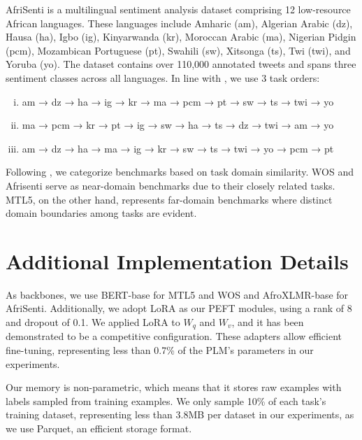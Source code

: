 \documentclass[11pt]{article}
\begin{document}
AfriSenti \cite{muhammad-etal-2023-afrisenti} is a multilingual sentiment analysis dataset comprising 12 low-resource African languages. These languages include Amharic (am), Algerian Arabic (dz), Hausa (ha), Igbo (ig), Kinyarwanda (kr), Moroccan Arabic (ma), Nigerian Pidgin (pcm), Mozambican Portuguese (pt), Swahili (sw), Xitsonga (ts), Twi (twi), and Yoruba (yo). The dataset contains over 110,000 annotated tweets and spans three sentiment classes across all languages.
In line with \cite{wang-etal-2023-rehearsal}, we use 3 task orders:

\begin{enumerate}[(i)]
    \small
    \itemsep-0.25em 
    \item am → dz → ha → ig → kr → ma → pcm → pt → sw → ts → twi → yo
    \item ma → pcm → kr → pt → ig → sw → ha → ts → dz → twi → am → yo
    \item am → dz → ha → ma → ig → kr → sw → ts → twi → yo → pcm → pt
\end{enumerate}

Following \citet{wang-etal-2023-rehearsal}, we categorize benchmarks based on task domain similarity. WOS and Afrisenti serve as near-domain benchmarks due to their closely related tasks. MTL5, on the other hand, represents far-domain benchmarks where distinct domain boundaries among tasks are evident.

\section{Additional Implementation Details}
\label{sec:appendix:model}

As backbones, we use BERT-base \cite{devlin-etal-2019-bert} for MTL5 and WOS and AfroXLMR-base \cite{alabi-etal-2022-adapting} for AfriSenti. Additionally, we adopt LoRA \cite{hu2022lora} as our PEFT modules, using a rank of 8 and dropout of 0.1. We applied LoRA to $W_q$ and $W_v$, and it has been demonstrated to be a competitive configuration. These adapters allow efficient fine-tuning, representing less than 0.7\% of the PLM’s parameters in our experiments.

Our memory is non-parametric, which means that it stores raw examples with labels sampled from training examples. We only sample 10\% of each task's training dataset, representing less than 3.8MB per dataset in our experiments, as we use Parquet, an efficient storage format.
\end{document}

